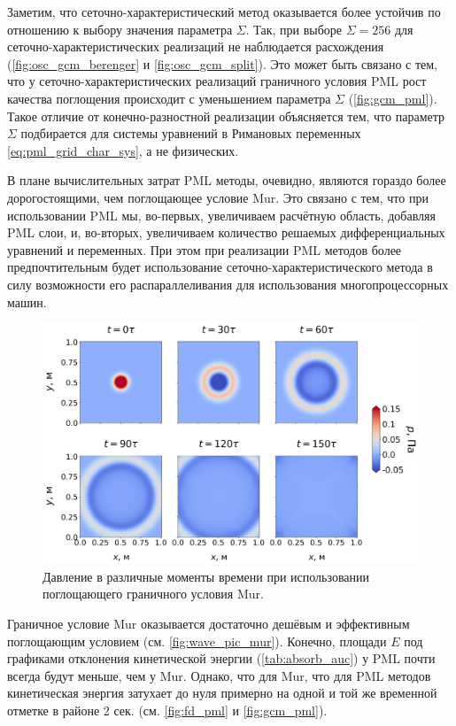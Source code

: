 Заметим, что сеточно-характеристический метод оказывается более устойчив по отношению к выбору значения параметра $\Sigma$. Так, при выборе $\Sigma=256$ для сеточно-характерис\-тических реализаций не наблюдается расхождения (\autoref{fig:osc_gcm_berenger} и \autoref{fig:osc_gcm_split}). Это может быть связано с тем, что у сеточно-характеристических реализаций граничного условия PML рост качества поглощения происходит с уменьшением параметра $\Sigma$ (\autoref{fig:gcm_pml}). Такое отличие от конечно-разностной реализации объясняется тем, что параметр $\Sigma$ подбирается для системы уравнений в Римановых переменных \eqref{eq:pml_grid_char_sys}, а не физических.

В плане вычислительных затрат PML методы, очевидно, являются гораздо более дорогостоящими, чем поглощающее условие Mur. Это связано с тем, что при использовании PML мы, во-первых, увеличиваем расчётную область, добавляя PML слои, и, во-вторых, увеличиваем количество  решаемых дифференциальных уравнений и переменных. При этом при реализации PML методов более предпочтительным будет использование сеточно-характеристического метода в силу возможности его распараллеливания для использования многопроцессорных машин.

\begin{figure}[H]
    \centering
    \includegraphics[width=1.0\textwidth]{images/pml/wave_pic_mur.png}
    \caption{Давление в различные моменты времени при использовании поглощающего граничного условия Mur.}
    \label{fig:wave_pic_mur}
\end{figure}

Граничное условие Mur оказывается достаточно дешёвым и эффективным поглощающим условием (см. \autoref{fig:wave_pic_mur}). Конечно, площади $E$ под графиками отклонения кинетической энергии (\autoref{tab:absorb_auc}) у PML почти всегда будут меньше, чем у Mur. Однако, что для Mur, что для PML методов кинетическая энергия затухает до нуля примерно на одной и той же временной отметке в районе 2 сек. (см. \autoref{fig:fd_pml} и \ref{fig:gcm_pml}).

